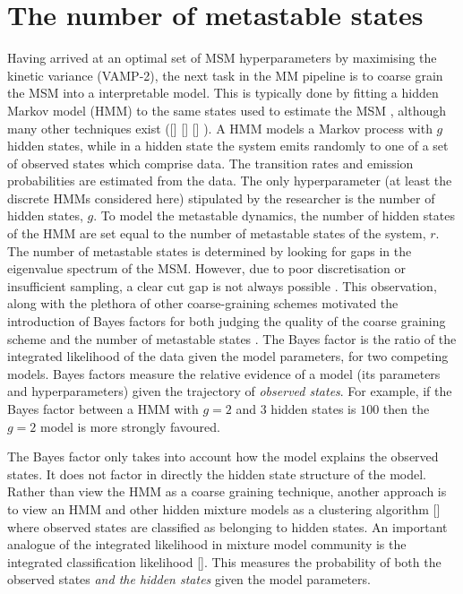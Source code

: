 \section{The number of metastable states}
Having arrived at an optimal set of MSM hyperparameters by maximising the kinetic variance (VAMP-2), the next task in the MM pipeline is to coarse grain the MSM into a interpretable model. This is typically done by fitting a hidden Markov model (HMM) to the same states used to estimate the MSM \cite{noeMarkovModelsMolecular2019b}, although many other techniques exist ([] [] [] ). A HMM models a Markov process with $g$ hidden states, while in a hidden state the system emits randomly to one of a set of observed states which comprise data. The transition rates and emission probabilities are estimated from the data.  The only hyperparameter (at least the discrete HMMs considered here) stipulated by the researcher is the number of hidden states, $g$. To model the metastable dynamics, the number of hidden states of the HMM are set equal to the number of metastable states of the system, $r$. The number of metastable states is determined by looking for gaps in the eigenvalue spectrum of the MSM. However, due to poor discretisation or insufficient sampling, a clear cut gap is not always possible \cite{bowmanQuantitativeComparisonAlternative2013}. This observation, along with the plethora of other coarse-graining schemes motivated the introduction of Bayes factors \cite{kassBayesFactors1995} for both judging the quality of the coarse graining scheme and the number of metastable states \cite{bacalladoBayesianComparisonMarkov2009a}. The Bayes factor is the ratio of the integrated likelihood of the data given the model parameters, for two competing models. Bayes factors measure the relative evidence of a model (its parameters and hyperparameters) given the trajectory of \emph{observed states}. For example, if the Bayes factor between a HMM with $g=2$ and  $3$ hidden states is $100$ then the $g=2$ model is more strongly favoured. 

The Bayes factor only takes into account how the model explains the observed states. It does not factor in directly the hidden state structure of the model. Rather than view the HMM as a coarse graining technique, another approach is to view an HMM and other hidden mixture models as a clustering algorithm [] where observed states are classified as belonging to hidden states. An important analogue of the integrated likelihood in mixture model community is the integrated classification likelihood []. This measures the probability of both the observed states \emph{and the hidden states} given the model parameters.

